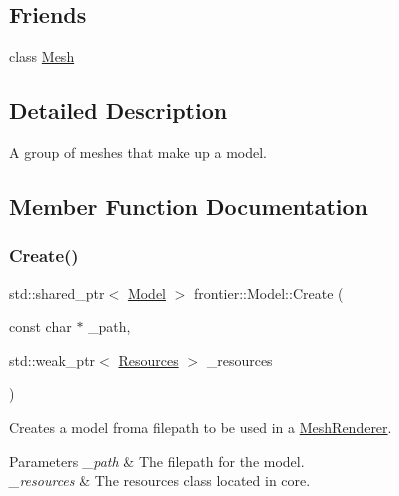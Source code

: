 \subsection*{Friends}
\begin{DoxyCompactItemize}
\item 
class \hyperlink{classfrontier_1_1_model_aa41a130f156b145bffb3f4b5172c4c93}{Mesh}
\end{DoxyCompactItemize}


\subsection{Detailed Description}
A group of meshes that make up a model. 

\subsection{Member Function Documentation}
\mbox{\label{classfrontier_1_1_model_a78f05cbc47e201551ccf3bbbd1d0fcbd}} 
\subsubsection{\texorpdfstring{Create()}{Create()}}
{\footnotesize\ttfamily std\+::shared\+\_\+ptr$<$ \hyperlink{classfrontier_1_1_model}{Model} $>$ frontier\+::\+Model\+::\+Create (\begin{DoxyParamCaption}\item[{const char $\ast$}]{\+\_\+path,  }\item[{std\+::weak\+\_\+ptr$<$ \hyperlink{classfrontier_1_1_resources}{Resources} $>$}]{\+\_\+resources }\end{DoxyParamCaption})\hspace{0.3cm}{\ttfamily [static]}}



Creates a model froma filepath to be used in a \hyperlink{classfrontier_1_1_mesh_renderer}{Mesh\+Renderer}. 


\begin{DoxyParams}{Parameters}
{\em \+\_\+path} & The filepath for the model. \\
\hline
{\em \+\_\+resources} & The resources class located in core. \\
\hline
\end{DoxyParams}
\mbox{\label{classfrontier_1_1_model_ab969b8ae4c222ac60f347a5008b19bad}} 
